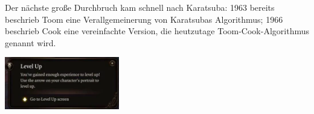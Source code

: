 
\begin{minipage}[l]{9cm}
\begin{remark}
    Der nächste große Durchbruch kam schnell nach Karatsuba: 1963 bereits beschrieb Toom\footnotemark{} eine Verallgemeinerung von Karatsubas Algorithmus; 1966 beschrieb Cook\footnotemark{} eine vereinfachte Version, die heutzutage Toom-Cook-Algorithmus genannt wird.
\end{remark}
\end{minipage}\hfill
\begin{minipage}{5cm}
    \setlength{\baselineskip}{7pt}
    \includegraphics[width=5cm]{levelup_bg}
\end{minipage}


